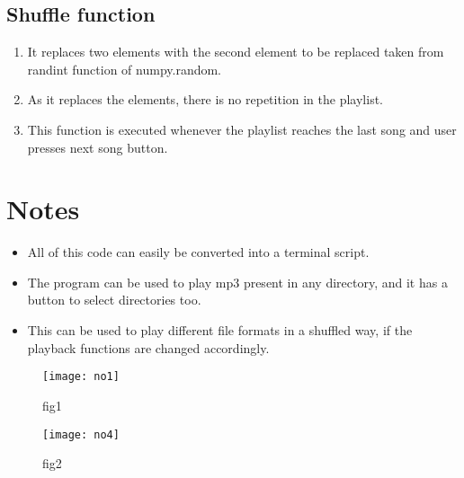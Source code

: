 \documentclass{article}
\begin{document}
\subsection*{Shuffle function}
\begin{enumerate}
    \item It replaces two elements with the second element to be replaced taken from randint function of numpy.random.
    \item As it replaces the elements, there is no repetition in the playlist.
    \item This function is executed whenever the playlist reaches the last song and user presses next song button.
\end{enumerate}

\section{Notes}
\begin{itemize}
    \item All of this code can easily be converted into a terminal script.
    \item The program can be used to play mp3 present in any directory, and it has a button to select directories too.
    \item This can be used to play different file formats in a shuffled way, if the playback functions are changed accordingly.
\end{itemize}

\begin{figure}[ht]
	\centering
	\texttt{[image: no1]}
	\caption{fig1}
	\label{fig:view}
\end{figure}
\FloatBarrier


\begin{figure}[ht]
	\centering
	\texttt{[image: no4]}
	\caption{fig2}
	\label{fig:view}
\end{figure}
\FloatBarrier
\end{document}
